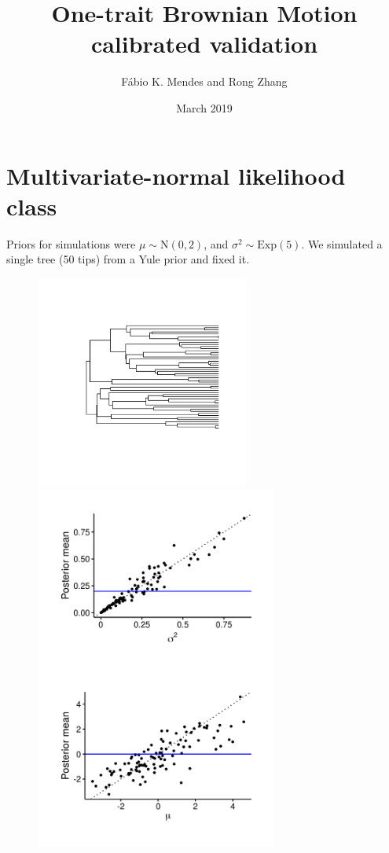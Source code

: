 \documentclass{article}
\title{One-trait Brownian Motion calibrated validation}
\author{F\'{a}bio K. Mendes and Rong Zhang}
\date{March 2019}
\begin{document}
\maketitle

\newpage

\section{Multivariate-normal likelihood class}

Priors for simulations were $\mu \sim \text{N}(0, 2)$, and $\sigma^2 \sim \text{Exp}(5)$. We simulated a single tree (50 tips) from a Yule prior and fixed it.

\begin{figure}[!ht]
  \begin{minipage}[c]{.4\textwidth}
    \centering
    \includegraphics[width=7cm]{../BMMVN_ultra_tree.png}
  \end{minipage}
  \hfill
  \begin{minipage}{.5\textwidth}
    \centering
    \includegraphics[width=8cm]{../BMMVN_ultra_graphs.png}
  \end{minipage}
\end{figure}
\end{document}
